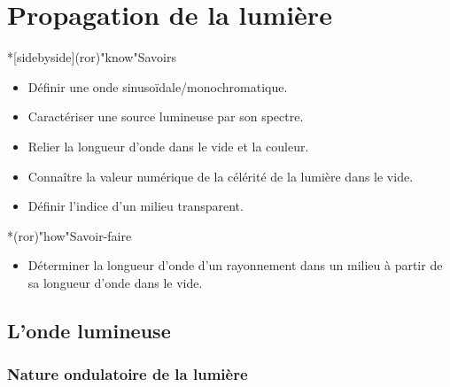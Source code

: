 \documentclass[../../main/main.tex]{subfiles}
\begin{document}
\chapter{Propagation de la lumi\`ere}

\vfill

\begin{prgm}
	\begin{tcb}*[sidebyside](ror)"know"{Savoirs}
		\begin{itemize}[label=$\diamond$, leftmargin=10pt]
			\item Définir une onde sinusoïdale/monochromatique.
			\item Caractériser une source lumineuse par son spectre.
			\item Relier la longueur d'onde dans le vide et la couleur.
		\end{itemize}
		\tcblower
		\begin{itemize}[label=$\diamond$, leftmargin=10pt]
			\item Connaître la valeur numérique de la célérité de la lumière dans le
			      vide.
			\item Définir l'indice d'un milieu transparent.
		\end{itemize}
	\end{tcb}

	\begin{tcb}*(ror)"how"{Savoir-faire}
		\begin{itemize}[label=$\diamond$, leftmargin=10pt]
			\item Déterminer la longueur d'onde d'un rayonnement dans un milieu à partir
			      de sa longueur d'onde dans le vide.
		\end{itemize}
	\end{tcb}
\end{prgm}

\vfill
\minitoc
\vfill

\newpage

\section{L'onde lumineuse}

\subsection{Nature ondulatoire de la lumière}
\end{document}
